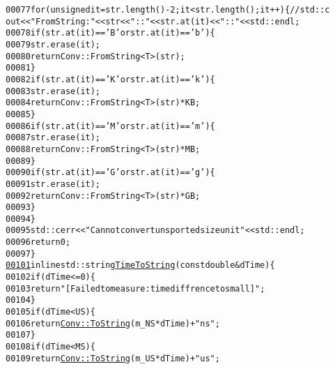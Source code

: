\begin{footnotesize}
\begin{alltt}
00077             \textcolor{keywordflow}{for} (\textcolor{keywordtype}{unsigned} it = str.length()-2; it < str.length(); it++)\{ \textcolor{comment}{//std::c
      out<<"FromString: "<<str<<"::"<<str.at(it)<<"::"<<std::endl;}
00078                 \textcolor{keywordflow}{if}(str.at(it) == \textcolor{charliteral}{'B'} or str.at(it) == \textcolor{charliteral}{'b'})\{
00079                     str.erase(it);
00080                     \textcolor{keywordflow}{return} Conv::FromString<T>(str);
00081                 \}
00082                 \textcolor{keywordflow}{if}(str.at(it) == \textcolor{charliteral}{'K'} or str.at(it) == \textcolor{charliteral}{'k'})\{
00083                     str.erase(it);
00084                     \textcolor{keywordflow}{return} Conv::FromString<T>(str) * KB;
00085                 \}
00086                 \textcolor{keywordflow}{if}(str.at(it) == \textcolor{charliteral}{'M'} or str.at(it) == \textcolor{charliteral}{'m'})\{
00087                     str.erase(it);
00088                     \textcolor{keywordflow}{return} Conv::FromString<T>(str) * MB;
00089                 \}
00090                 \textcolor{keywordflow}{if}(str.at(it) == \textcolor{charliteral}{'G'} or str.at(it) == \textcolor{charliteral}{'g'})\{
00091                     str.erase(it);
00092                     \textcolor{keywordflow}{return} Conv::FromString<T>(str) * GB;
00093                 \}
00094             \}
00095             std::cerr<<\textcolor{stringliteral}{"Cannot convert unsported size unit"}<<std::endl;
00096             \textcolor{keywordflow}{return} 0;
00097         \}
\hypertarget{myConv_8hpp_source_l00101}{}\hyperlink{group__libbuskol_ga6c72f99eb28381403eb06abee5ea7c44}{00101}         \textcolor{keyword}{inline} std::string \hyperlink{group__libbuskol_ga6c72f99eb28381403eb06abee5ea7c44}{TimeToString}(\textcolor{keyword}{const} \textcolor{keywordtype}{double} &dTime)\{
00102             \textcolor{keywordflow}{if} ( dTime <= 0)\{
00103                 \textcolor{keywordflow}{return} \textcolor{stringliteral}{"[Failed to measure: time diffrence to small]"};
00104             \}
00105             \textcolor{keywordflow}{if} (dTime < US)\{
00106                 \textcolor{keywordflow}{return} \hyperlink{group__libbuskol_ga0b261d6de4c26434d56ba40d00daa68a}{Conv::ToString}(m\_NS * dTime)+\textcolor{stringliteral}{"ns"};
00107             \}
00108             \textcolor{keywordflow}{if}(dTime < MS)\{
00109                 \textcolor{keywordflow}{return} \hyperlink{group__libbuskol_ga0b261d6de4c26434d56ba40d00daa68a}{Conv::ToString}(m\_US * dTime)+\textcolor{stringliteral}{"us"};

\end{alltt}
\end{footnotesize}
